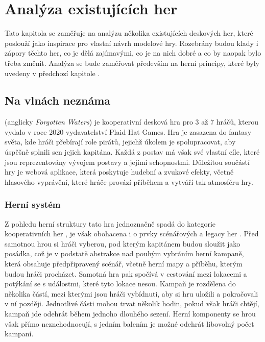 \chapter{Analýza existujících her}
\label{chap:game_analysis}

Tato kapitola se zaměřuje na analýzu několika existujících deskových her, které poslouží jako inspirace pro vlastní návrh modelové hry. Rozebrány budou klady i zápory těchto her, co je dělá zajímavými, co je na nich dobré a co by naopak bylo třeba změnit. Analýza se bude zaměřovat především na herní principy, které byly uvedeny v předchozí kapitole .



\section{Na vlnách neznáma}
\label{sec:forgotten_waters}

 (anglicky \textit{Forgotten Waters}) je kooperativní desková hra pro 3 až 7 hráčů, kterou vydalo v roce 2020 vydavatelství Plaid Hat Games. Hra je zasazena do fantasy světa, kde hráči přebírají role pirátů, jejichž úkolem je spolupracovat, aby úspěšně splnili sen jejich kapitána. Každá z postav má však své vlastní cíle, které jsou reprezentovány vývojem postavy a jejími schopnostmi. Důležitou součástí hry je webová aplikace, která poskytuje hudební a zvukové efekty, včetně hlasového vyprávění, které hráče provází příběhem a vytváří tak atmosféru hry. \cite{forgotten_waters}


\subsection{Herní systém}
\label{subsec:fw_gameplay}

Z pohledu herní struktury tato hra jednoznačně spadá do kategorie kooperativních her , je však obohacena i o prvky scénářových  a legacy her . Před samotnou hrou si hráči vyberou, pod kterým kapitánem budou sloužit jako posádka, což je v podstatě abstrakce nad pouhým vybráním herní kampaně, která obsahuje předpřipravený scénář, včetně herní mapy a příběhu, kterým budou hráči procházet. Samotná hra pak spočívá v cestování mezi lokacemi a potýkání se s událostmi, které tyto lokace nesou. Kampaň je rozdělena do několika částí, mezi kterými jsou hráči vybídnuti, aby si hru uložili a pokračovali v ní později. Jednotlivé části mohou trvat několik hodin, pokud však hráči chtějí, kampaň jde odehrát během jednoho dlouhého sezení. Herní komponenty se hrou však přímo neznehodnocují, s jedním balením je možné odehrát libovolný počet kampaní.

